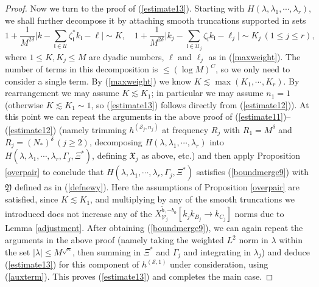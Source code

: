 \documentclass[11 pt,reqno]{amsart}
\theoremstyle{definition}
\theoremstyle{remark}
\numberwithin{equation}{section}
\newcommand{\Sc}{\mathcal{S}}
\newcommand{\Uc}{\mathcal{U}}
\newcommand{\Vc}{\mathcal{V}}
\newcommand{\Xf}{\mathfrak{X}}
\newcommand{\lf}{\mathfrak{l}}
\newcommand{\Yf}{\mathfrak{Y}}
\begin{document}
{\begin{proof}
Now we turn to the proof of (\ref{estimate13}). Starting with $H(\lambda,\lambda_1,\cdots,\lambda_r)$, we shall further decompose it by attaching smooth truncations supported in sets
\begin{equation}\label{maxweight2}1+\frac{1}{M^{2\delta}}\bigg|k-\sum_{\lf\in\Uc}\zeta_\lf^* k_\lf-\ell\bigg|\sim K,\quad 1+\frac{1}{M^{2\delta}}\bigg|k_j-\sum_{\lf\in\Uc_j}\zeta_\lf k_\lf-\ell_j\bigg|\sim K_j\,(1\leq j\leq r),\end{equation}
where $1\leq K,K_j\leq M$ are dyadic numbers, $\ell$ and $\ell_j$ as in (\ref{maxweight}). The number of terms in this decomposition is $\leq (\log M)^C$, so we only need to consider a single term. By (\ref{maxweight}) we know $K\lesssim\max(K_1,\cdots,K_r)$. By rearrangement we may assume $K\lesssim K_1$; in particular we may assume $n_1=1$ (otherwise $K\lesssim K_1\sim 1$, so (\ref{estimate13}) follows directly from (\ref{estimate12})). At this point we can repeat the arguments in the above proof of (\ref{estimate11})--(\ref{estimate12}) (namely trimming $h^{(\Sc_j,n_j)}$ at frequency $R_j$ with $R_1=M^\delta$ and $R_j=(N_*)^\delta\,(j\geq 2)$, decomposing $H(\lambda,\lambda_1,\cdots,\lambda_r)$ into $H(\lambda,\lambda_1,\cdots,\lambda_r,\Gamma_j,\Xi^*)$, defining $\Xf_j$ as above, etc.) and then apply Proposition \ref{overpair} to conclude that $H(\lambda,\lambda_1,\cdots,\lambda_r,\Gamma_j,\Xi^*)$ satisfies (\ref{boundmerge9}) with $\Yf$ defined as in (\ref{defnewy}). Here the assumptions of Proposition \ref{overpair} are satisfied, since $K\lesssim K_1$, and multiplying by any of the smooth truncations we introduced does not increase any of the $X_{\Vc_j}^{\widetilde{b},-b_0}[k_jk_{B_j}\to k_{C_j}]$ norms due to Lemma \ref{adjustment}. After obtaining (\ref{boundmerge9}), we can again repeat the arguments in the above proof (namely taking the weighted $L^2$ norm in $\lambda$ within the set $|\lambda|\leq M^{\sqrt{\kappa}}$, then summing in $\Xi^*$ and $\Gamma_j$ and integrating in $\lambda_j$) and deduce (\ref{estimate13}) for this component of $h^{(\Sc,1)}$ under consideration, using (\ref{auxterm}). This proves (\ref{estimate13}) and completes the main case.


\end{proof}}
\end{document}
